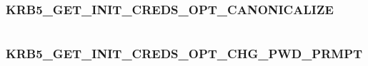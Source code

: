 \documentclass[letterpaper,10pt,english]{sphinxmanual}
\begin{document}
\begin{fulllineitems}
\label{appdev/refs/macros/KRB5_GET_INIT_CREDS_OPT_ANONYMOUS:KRB5_GET_INIT_CREDS_OPT_ANONYMOUS}
\end{fulllineitems}


\begin{tabulary}{\linewidth}{|L|L|}
\hline

 & 
\\
\hline\end{tabulary}



\subsubsection{KRB5\_GET\_INIT\_CREDS\_OPT\_CANONICALIZE}
\label{appdev/refs/macros/KRB5_GET_INIT_CREDS_OPT_CANONICALIZE::doc}\label{appdev/refs/macros/KRB5_GET_INIT_CREDS_OPT_CANONICALIZE:krb5-get-init-creds-opt-canonicalize-data}\label{appdev/refs/macros/KRB5_GET_INIT_CREDS_OPT_CANONICALIZE:krb5-get-init-creds-opt-canonicalize}

\begin{fulllineitems}
\label{appdev/refs/macros/KRB5_GET_INIT_CREDS_OPT_CANONICALIZE:KRB5_GET_INIT_CREDS_OPT_CANONICALIZE}
\end{fulllineitems}


\begin{tabulary}{\linewidth}{|L|L|}
\hline

 & 
\\
\hline\end{tabulary}



\subsubsection{KRB5\_GET\_INIT\_CREDS\_OPT\_CHG\_PWD\_PRMPT}
\label{appdev/refs/macros/KRB5_GET_INIT_CREDS_OPT_CHG_PWD_PRMPT::doc}\label{appdev/refs/macros/KRB5_GET_INIT_CREDS_OPT_CHG_PWD_PRMPT:krb5-get-init-creds-opt-chg-pwd-prmpt}\label{appdev/refs/macros/KRB5_GET_INIT_CREDS_OPT_CHG_PWD_PRMPT:krb5-get-init-creds-opt-chg-pwd-prmpt-data}
\end{document}
